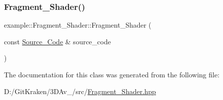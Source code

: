 \subsubsection{\texorpdfstring{Fragment\+\_\+\+Shader()}{Fragment\_Shader()}}
{\footnotesize\ttfamily example\+::\+Fragment\+\_\+\+Shader\+::\+Fragment\+\_\+\+Shader (\begin{DoxyParamCaption}\item[{const \mbox{\hyperlink{classexample_1_1_shader_1_1_source___code}{Source\+\_\+\+Code}} \&}]{source\+\_\+code }\end{DoxyParamCaption})\hspace{0.3cm}{\ttfamily [inline]}}



The documentation for this class was generated from the following file\+:\begin{DoxyCompactItemize}
\item 
D\+:/\+Git\+Kraken/3\+D\+Av\+\_/src/\mbox{\hyperlink{_fragment___shader_8hpp}{Fragment\+\_\+\+Shader.\+hpp}}\end{DoxyCompactItemize}
